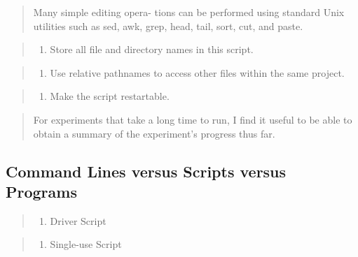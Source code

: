 \documentclass[12pt,]{book}
\providecommand{\tightlist}{%
  \setlength{\itemsep}{0pt}\setlength{\parskip}{0pt}}
\begin{document}
\begin{quote}
Many simple editing opera- tions can be performed using standard Unix
utilities such as sed, awk, grep, head, tail, sort, cut, and paste.
\end{quote}

\begin{quote}
\begin{enumerate}
\def\labelenumi{\arabic{enumi}.}
\setcounter{enumi}{3}
\tightlist
\item
  Store all file and directory names in this script.
\end{enumerate}
\end{quote}

\begin{quote}
\begin{enumerate}
\def\labelenumi{\arabic{enumi}.}
\setcounter{enumi}{4}
\tightlist
\item
  Use relative pathnames to access other files within the same project.
\end{enumerate}
\end{quote}

\begin{quote}
\begin{enumerate}
\def\labelenumi{\arabic{enumi}.}
\setcounter{enumi}{5}
\tightlist
\item
  Make the script restartable.
\end{enumerate}
\end{quote}

\begin{quote}
For experiments that take a long time to run, I find it useful to be
able to obtain a summary of the experiment's progress thus far.
\end{quote}

\subsection{Command Lines versus Scripts versus
Programs}\label{command-lines-versus-scripts-versus-programs}

\begin{quote}
\begin{enumerate}
\def\labelenumi{\arabic{enumi}.}
\tightlist
\item
  Driver Script
\end{enumerate}
\end{quote}

\begin{quote}
\begin{enumerate}
\def\labelenumi{\arabic{enumi}.}
\setcounter{enumi}{1}
\tightlist
\item
  Single-use Script
\end{enumerate}
\end{quote}
\end{document}
